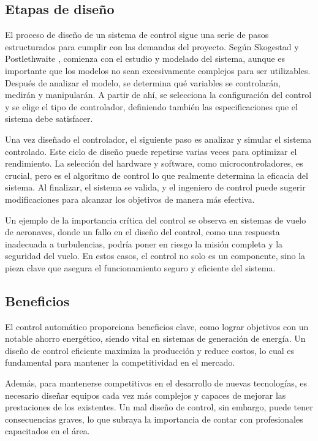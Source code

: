 \documentclass[journal, table]{IEEEtran}
\begin{document}
\subsection{Etapas de diseño}%
\label{sub:Etapas de diseño}

El proceso de diseño de un sistema de control sigue una serie de pasos
estructurados para cumplir con las demandas del proyecto.
Según Skogestad y Postlethwaite \cite{skogestad-1996}, comienza con el estudio y modelado del sistema, aunque es
importante que los modelos no sean excesivamente complejos para ser utilizables.
Después de analizar el modelo, se determina qué variables se controlarán,
medirán y manipularán.
A partir de ahí, se selecciona la configuración del control y se elige el tipo
de controlador, definiendo también las especificaciones que el sistema debe
satisfacer.

Una vez diseñado el controlador, el siguiente paso es analizar y simular el
sistema controlado.
Este ciclo de diseño puede repetirse varias veces para optimizar el rendimiento.
La selección del hardware y software, como microcontroladores, es crucial,
pero es el algoritmo de control lo que realmente determina la eficacia del
sistema.
Al finalizar, el sistema se valida, y el ingeniero de control puede sugerir
modificaciones para alcanzar los objetivos de manera más efectiva.

Un ejemplo de la importancia crítica del control se observa en sistemas de
vuelo de aeronaves, donde un fallo en el diseño del control, como una respuesta
inadecuada a turbulencias, podría poner en riesgo la misión completa y la
seguridad del vuelo.
En estos casos, el control no solo es un componente, sino la pieza clave que
asegura el funcionamiento seguro y eficiente del sistema.

\subsection{Beneficios}%
\label{sub:Beneficios}

El control automático proporciona beneficios clave, como lograr objetivos con
un notable ahorro energético, siendo vital en sistemas de generación de energía.
Un diseño de control eficiente maximiza la producción y reduce costos, lo cual
es fundamental para mantener la competitividad en el mercado.

Además, para mantenerse competitivos en el desarrollo de nuevas tecnologías,
es necesario diseñar equipos cada vez más complejos y capaces de mejorar las
prestaciones de los existentes.
Un mal diseño de control, sin embargo, puede tener consecuencias graves,
lo que subraya la importancia de contar con profesionales capacitados en el área.
\end{document}
